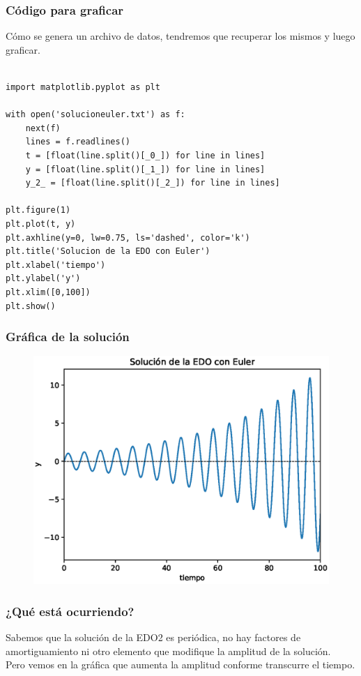\begin{frame}
\frametitle{Código para graficar}
Cómo se genera un archivo de datos, tendremos que recuperar los mismos y luego graficar.
\begin{lstlisting}[caption=Código para graficar, style=FormattedNumber, basicstyle=\linespread{1.1}\ttfamily=\small, columns=fullflexible]

import matplotlib.pyplot as plt

with open('solucioneuler.txt') as f:
    next(f)
    lines = f.readlines()
    t = [float(line.split()[_0_]) for line in lines]
    y = [float(line.split()[_1_]) for line in lines]
    y_2_ = [float(line.split()[_2_]) for line in lines]

plt.figure(1)
plt.plot(t, y)
plt.axhline(y=0, lw=0.75, ls='dashed', color='k')
plt.title('Solucion de la EDO con Euler')
plt.xlabel('tiempo')
plt.ylabel('y')
plt.xlim([0,100])
plt.show()
\end{lstlisting}
\end{frame}
\begin{frame}[plain]
\frametitle{Gráfica de la solución}
\begin{figure}
	\centering
	\includegraphics[scale=0.65]{Imagenes/solucion_euler_01.eps}
\end{figure}
\end{frame}
\begin{frame}
\frametitle{¿Qué está ocurriendo?}
Sabemos que la solución de la EDO2 es periódica, no hay factores de amortiguamiento ni otro elemento que modifique la amplitud de la solución.
\\
\bigskip
Pero vemos en la gráfica que aumenta la amplitud conforme transcurre el tiempo.
\end{frame}
